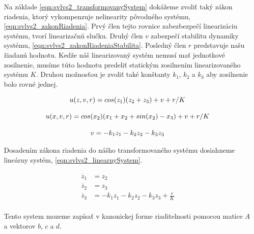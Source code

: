 \documentclass[../main.tex]{subfiles}
\begin{document}
Na základe \cref{eqn:svlvs2_transformovanySystem} dokážeme zvoliť taký zákon riadenia, ktorý vykompenzuje nelinearity pôvodného systému,  \cref{eqn:svlvs2_zakonRiadenia}. Prvý člen tejto rovnice zabezbezpečí linearizáciu systému, tvorí linearizačnú slučku. Druhý člen $v$ zabezpečí stabilitu dynamiky systému, \cref{eqn:svlvs2_zakonRiadeniaStabilita}. Posledný člen $r$ predstavuje našu žiadanú hodnotu. Kedže náš linearizovaný systém nemusí mať jednotkové zosilnenie, musíme túto hodnotu predeliť statickým zosilnením linearizovaného systému $K$. Druhou možnosťou je zvoliť také konštanty $k_1$, $k_2$ a $k_3$ aby zosilnenie bolo rovné jednej.

	\begin{equation}
		u(z,v,r) = cos(z_1)(z_2+z_3) + v + r/K										\\
		\label{eqn:svlvs2_zakonRiadenia}
	\end{equation}

	\begin{equation}
		u(x,v,r) = cos(x_2)(x_1 + x_2+sin(x_2) - x_3) + v + r/K										\\
		\label{eqn:svlvs2_zakonRiadeniaX}
	\end{equation}

	\begin{equation}
		v = -k_1 z_1 - k_2 z_2 -k_3 z_3										\\
		\label{eqn:svlvs2_zakonRiadeniaStabilita}
	\end{equation}

Dosadením zákona riadenia do nášho transformovaného systému dosiahneme lineárny systém, \cref{eqn:svlvs2_linearnySystem}.

	\begin{equation}
		\begin{aligned}
		\dot{z_1} &=  z_2												\\
		\dot{z_2} &=  z_3												\\
		\dot{z_3} &=   -k_1 z_1 - k_2 z_2 -k_3 z_3 + \frac{r}{K}					\\
		\end{aligned}
		\label{eqn:svlvs2_linearnySystem}
	\end{equation}

Tento system mozeme zapísať v kanonickej forme riaditelnosti pomocou matice $A$ a vektorov $b$, $c$ a $d$.
\end{document}
